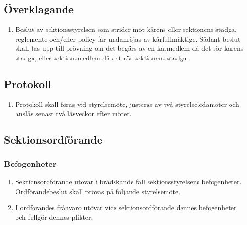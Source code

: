 \documentclass[11pt,a4paper]{article}
\begin{document}
\subsection{Överklagande}

\begin{enumerate}[\thesubsection .1]

  \item Beslut av sektionsstyrelsen som strider mot kårens eller sektionens stadga, reglemente och/eller policy får undanröjas av kårfullmäktige. Sådant beslut skall tas upp till prövning om det begärs av en kårmedlem då det rör kårens stadga, eller sektionsmedlem då det rör sektionens stadga.

\end{enumerate}

\subsection{Protokoll}

\begin{enumerate}[\thesubsection .1]

  \item Protokoll skall föras vid styrelsemöte, justeras av två
  styrelseledamöter och anslås senast två läsveckor efter mötet.

\end{enumerate}



\subsection{Sektionsordförande}

\subsubsection{Befogenheter}

\begin{enumerate}[\thesubsection .1]

  \item Sektionsordförande utövar i brådskande fall sektionsstyrelsens befogenheter. Ordförandebeslut skall prövas på följande styrelsemöte.

  \item I ordförandes frånvaro utövar vice sektionsordförande dennes
  befogenheter och fullgör dennes plikter.

\end{enumerate}
\end{document}
